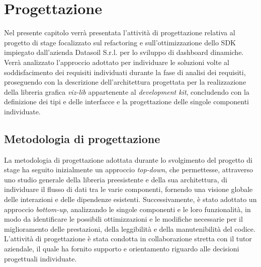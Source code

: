 \chapter{Progettazione}
\label{chap:progettazione}
Nel presente capitolo verrà presentata l'attività di progettazione relativa al progetto di stage focalizzato sul refactoring e
sull'ottimizzazione dello SDK impiegato dall'azienda Datasoil S.r.l. per lo sviluppo di dashboard dinamiche.
Verrà analizzato l'approccio adottato per individuare le soluzioni volte al soddisfacimento dei requisiti individuati durante
la fase di analisi dei requisiti, proseguendo con la descrizione dell'architettura progettata per la realizzazione della libreria grafica \textit{viz-lib}
appartenente al \textit{development kit}, concludendo con la definizione dei tipi e delle interfacce e la progettazione delle singole componenti individuate.

\section{Metodologia di progettazione}
La metodologia di progettazione adottata durante lo svolgimento del progetto di stage ha seguito inizialmente un approccio
\textit{top-down}, che permettesse, attraverso uno studio generale della libreria preesistente e della sua architettura, di individuare
il flusso di dati tra le varie componenti, fornendo una visione globale delle interazioni e delle dipendenze esistenti.
Successivamente, è stato adottato un approccio \textit{bottom-up}, analizzando le singole componenti e le loro funzionalità,
in modo da identificare le possibili ottimizzazioni e le modifiche necessarie per il miglioramento delle prestazioni, della leggibilità e
della manutenibilità del codice.\newline
L'attività di progettazione è stata condotta in collaborazione stretta con il tutor aziendale, il quale ha fornito supporto e orientamento
riguardo alle decisioni progettuali individuate.

